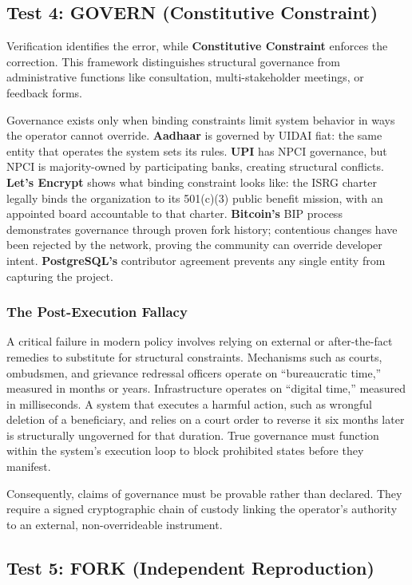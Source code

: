 \documentclass{article}
\begin{document}
\subsection{Test 4: GOVERN (Constitutive Constraint)}

Verification identifies the error, while \textbf{Constitutive Constraint} enforces the correction. This framework distinguishes structural governance from administrative functions like consultation, multi-stakeholder meetings, or feedback forms.

Governance exists only when binding constraints limit system behavior in ways the operator cannot override. \textbf{Aadhaar} is governed by UIDAI fiat: the same entity that operates the system sets its rules. \textbf{UPI} has NPCI governance, but NPCI is majority-owned by participating banks, creating structural conflicts. \textbf{Let's Encrypt} shows what binding constraint looks like: the ISRG charter legally binds the organization to its 501(c)(3) public benefit mission, with an appointed board accountable to that charter. \textbf{Bitcoin's} BIP process demonstrates governance through proven fork history; contentious changes have been rejected by the network, proving the community can override developer intent. \textbf{PostgreSQL's} contributor agreement prevents any single entity from capturing the project.

\subsubsection{The Post-Execution Fallacy}
A critical failure in modern policy involves relying on external or after-the-fact remedies to substitute for structural constraints. Mechanisms such as courts, ombudsmen, and grievance redressal officers operate on ``bureaucratic time,'' measured in months or years. Infrastructure operates on ``digital time,'' measured in milliseconds. A system that executes a harmful action, such as wrongful deletion of a beneficiary, and relies on a court order to reverse it six months later is structurally ungoverned for that duration. True governance must function within the system's execution loop to block prohibited states before they manifest.

Consequently, claims of governance must be provable rather than declared. They require a signed cryptographic chain of custody linking the operator's authority to an external, non-overrideable instrument.

\subsection{Test 5: FORK (Independent Reproduction)}
\end{document}
